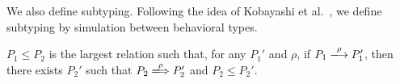 We also define subtyping.  Following the idea of Kobayashi et
al.~\cite{}, we define subtyping by simulation between behavioral
types.

 \begin{myDef}[Subtype]

\(P_1 \le P_2\) is the largest relation such that, for any \(P_1'\)
and \(\rho\), if \(P_1 \xlongrightarrow{\rho} P_1'\), then there
exists \(P_2'\) such that \(P_2 \xLongrightarrow{\rho} P_2'\) and
\(P_2 \le P_2'\).

\label{df:subtype}
\end{myDef}

